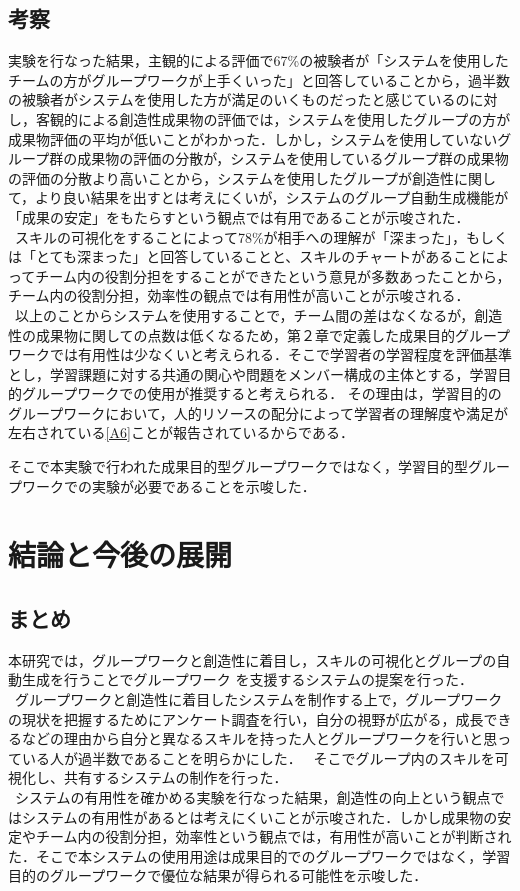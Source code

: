 \documentclass{funthesis}
\begin{document}
\section{考察}
実験を行なった結果，主観的による評価で67\%の被験者が「システムを使用したチームの方がグループワークが上手くいった」と回答していることから，過半数
の被験者がシステムを使用した方が満足のいくものだったと感じているのに対し，客観的による創造性成果物の評価では，システムを使用したグループの方が成果物評価の平均が低いことがわかった．しかし，システムを使用していないグループ群の成果物の評価の分散が，システムを使用しているグループ群の成果物の評価の分散より高いことから，システムを使用したグループが創造性に関して，より良い結果を出すとは考えにくいが，システムのグループ自動生成機能が「成果の安定」をもたらすという観点では有用であることが示唆された．\\
\ スキルの可視化をすることによって78\%が相手への理解が「深まった」，もしくは「とても深まった」と回答していることと、スキルのチャートがあることによってチーム内の役割分担をすることができたという意見が多数あったことから，チーム内の役割分担，効率性の観点では有用性が高いことが示唆される．\\
\ 以上のことからシステムを使用することで，チーム間の差はなくなるが，創造性の成果物に関しての点数は低くなるため，第２章で定義した成果目的グループワークでは有用性は少なくいと考えられる．そこで学習者の学習程度を評価基準とし，学習課題に対する共通の関心や問題をメンバー構成の主体とする，学習目的グループワークでの使用が推奨すると考えられる． その理由は，学習目的のグループワークにおいて，人的リソースの配分によって学習者の理解度や満足が左右されている\ref{A6}ことが報告されているからである．

そこで本実験で行われた成果目的型グループワークではなく，学習目的型グループワークでの実験が必要であることを示唆した．


\chapter{結論と今後の展開}
\section{まとめ}
本研究では，グループワークと創造性に着目し，スキルの可視化とグループの自動生成を行うことでグループワーク
を支援するシステムの提案を行った．\\
\ グループワークと創造性に着目したシステムを制作する上で，グループワークの現状を把握するためにアンケート調査を行い，自分の視野が広がる，成長できるなどの理由から自分と異なるスキルを持った人とグループワークを行いと思っている人が過半数であることを明らかにした．
\ そこでグループ内のスキルを可視化し、共有するシステムの制作を行った．\\
\ システムの有用性を確かめる実験を行なった結果，創造性の向上という観点ではシステムの有用性があるとは考えにくいことが示唆された．しかし成果物の安定やチーム内の役割分担，効率性という観点では，有用性が高いことが判断された．そこで本システムの使用用途は成果目的でのグループワークではなく，学習目的のグループワークで優位な結果が得られる可能性を示唆した．
\end{document}
